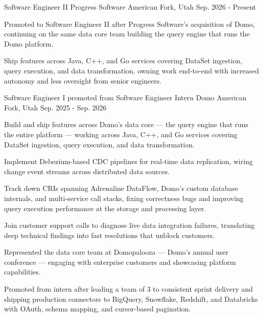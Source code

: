 \documentclass[11pt, letterpaper]{awesome-cv}
\begin{document}
\begin{cventries}

  \cventry
    {Software Engineer II}
    {Progress Software}
    {American Fork, Utah}
    {Sep. 2026 - Present}
    {
      \begin{cvitems}
        \item {Promoted to Software Engineer II after Progress Software's acquisition of Domo, continuing on the same data core team building the query engine that runs the Domo platform.}
        \item {Ship features across Java, C++, and Go services covering DataSet ingestion, query execution, and data transformation, owning work end-to-end with increased autonomy and less oversight from senior engineers.}
      \end{cvitems}
    }

  \cventry
    {Software Engineer I {\enskip\cdotp\enskip} promoted from Software Engineer Intern}
    {Domo}
    {American Fork, Utah}
    {Sep. 2025 - Sep. 2026}
    {
      \begin{cvitems}
        \item {Build and ship features across Domo's data core --- the query engine that runs the entire platform --- working across Java, C++, and Go services covering DataSet ingestion, query execution, and data transformation.}
        \item {Implement Debezium-based CDC pipelines for real-time data replication, wiring change event streams across distributed data sources.}
        \item {Track down CRIs spanning Adrenaline DataFlow, Domo's custom database internals, and multi-service call stacks, fixing correctness bugs and improving query execution performance at the storage and processing layer.}
        \item {Join customer support calls to diagnose live data integration failures, translating deep technical findings into fast resolutions that unblock customers.}
        \item {Represented the data core team at Domopalooza --- Domo's annual user conference --- engaging with enterprise customers and showcasing platform capabilities.}
        \item {Promoted from intern after leading a team of 3 to consistent sprint delivery and shipping production connectors to BigQuery, Snowflake, Redshift, and Databricks with OAuth, schema mapping, and cursor-based pagination.}
      \end{cvitems}
    }


\end{cventries}
\end{document}
